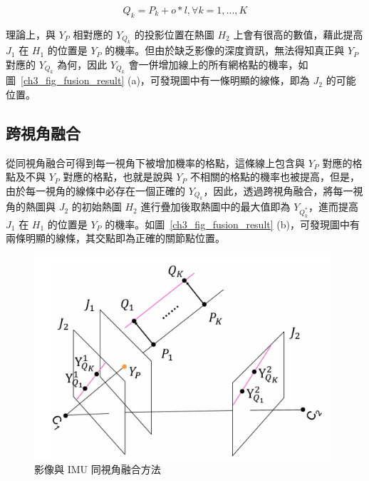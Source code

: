 \begin{equation}
   Q_k=P_k+o*l, \forall k=1,...,K
   \label{ch3_equ_cal_qk}
\end{equation}

理論上，與 $Y_P$ 相對應的 $Y_{Q_k}$ 的投影位置在熱圖 $H_2$ 上會有很高的數值，藉此提高 $J_1$ 在 $H_1$ 的位置是 $Y_P$ 的機率。但由於缺乏影像的深度資訊，無法得知真正與 $Y_P$ 對應的 $Y_{Q_k}$ 為何，因此 $Y_{Q_k}$ 會一併增加線上的所有網格點的機率，如圖~\ref{ch3_fig_fusion_result} (a)，可發現圖中有一條明顯的線條，即為 $J_2$ 的可能位置。


\subsection{跨視角融合}
從同視角融合可得到每一視角下被增加機率的格點，這條線上包含與 $Y_P$ 對應的格點及不與 $Y_P$ 對應的格點，也就是說與 $Y_P$ 不相關的格點的機率也被提高，但是，由於每一視角的線條中必存在一個正確的 $Y_{Q_k}$，因此，透過跨視角融合，將每一視角的熱圖與 $J_2$ 的初始熱圖 $H_2$ 進行疊加後取熱圖中的最大值即為 $Y_{Q_k^*}$，進而提高 $J_1$ 在 $H_1$ 的位置是 $Y_P$ 的機率。如圖~\ref{ch3_fig_fusion_result} (b)，可發現圖中有兩條明顯的線條，其交點即為正確的關節點位置。


\begin{figure}[!ht]
   \centering
   \includegraphics[width=11cm]{figure/ch3_fig_joint_project.png}
    \caption[影像與 IMU 同視角融合方法]{影像與 IMU 同視角融合方法}
    \label{ch3_fig_joint_project}
\end{figure}

